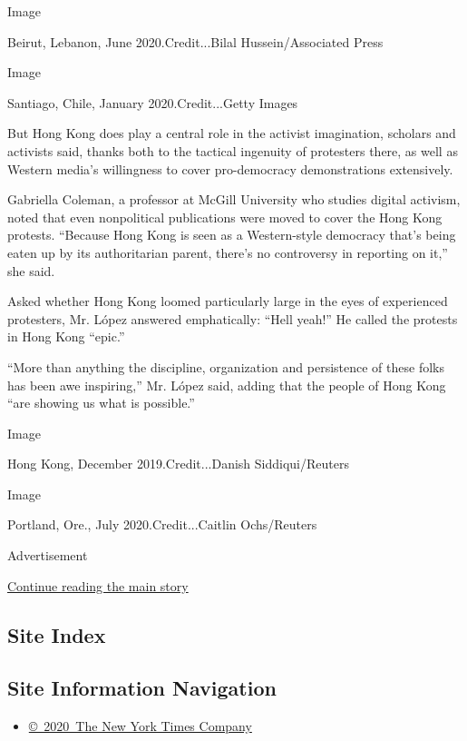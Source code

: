 Image

Beirut, Lebanon, June 2020.Credit...Bilal Hussein/Associated Press

Image

Santiago, Chile, January 2020.Credit...Getty Images

But Hong Kong does play a central role in the activist imagination,
scholars and activists said, thanks both to the tactical ingenuity of
protesters there, as well as Western media's willingness to cover
pro-democracy demonstrations extensively.

Gabriella Coleman, a professor at McGill University who studies digital
activism, noted that even nonpolitical publications were moved to cover
the Hong Kong protests. ``Because Hong Kong is seen as a Western-style
democracy that's being eaten up by its authoritarian parent, there's no
controversy in reporting on it,'' she said.

Asked whether Hong Kong loomed particularly large in the eyes of
experienced protesters, Mr. López answered emphatically: ``Hell yeah!''
He called the protests in Hong Kong ``epic.''

``More than anything the discipline, organization and persistence of
these folks has been awe inspiring,'' Mr. López said, adding that the
people of Hong Kong ``are showing us what is possible.''

Image

Hong Kong, December 2019.Credit...Danish Siddiqui/Reuters

Image

Portland, Ore., July 2020.Credit...Caitlin Ochs/Reuters

Advertisement

\protect\hyperlink{after-bottom}{Continue reading the main story}

\hypertarget{site-index}{%
\subsection{Site Index}\label{site-index}}

\hypertarget{site-information-navigation}{%
\subsection{Site Information
Navigation}\label{site-information-navigation}}

\begin{itemize}
\tightlist
\item
  \href{https://help.nytimes3xbfgragh.onion/hc/en-us/articles/115014792127-Copyright-notice}{©~2020~The
  New York Times Company}
\end{itemize}

